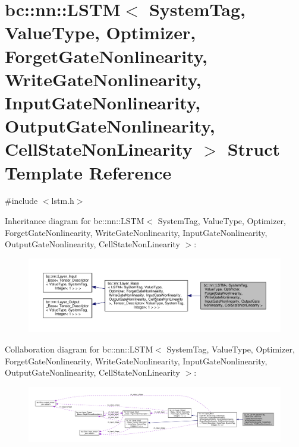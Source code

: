\hypertarget{structbc_1_1nn_1_1LSTM}{}\section{bc\+:\+:nn\+:\+:L\+S\+TM$<$ System\+Tag, Value\+Type, Optimizer, Forget\+Gate\+Nonlinearity, Write\+Gate\+Nonlinearity, Input\+Gate\+Nonlinearity, Output\+Gate\+Nonlinearity, Cell\+State\+Non\+Linearity $>$ Struct Template Reference}
\label{structbc_1_1nn_1_1LSTM}


{\ttfamily \#include $<$lstm.\+h$>$}



Inheritance diagram for bc\+:\+:nn\+:\+:L\+S\+TM$<$ System\+Tag, Value\+Type, Optimizer, Forget\+Gate\+Nonlinearity, Write\+Gate\+Nonlinearity, Input\+Gate\+Nonlinearity, Output\+Gate\+Nonlinearity, Cell\+State\+Non\+Linearity $>$\+:\nopagebreak
\begin{figure}[H]
\begin{center}
\leavevmode
\includegraphics[width=350pt]{structbc_1_1nn_1_1LSTM__inherit__graph}
\end{center}
\end{figure}


Collaboration diagram for bc\+:\+:nn\+:\+:L\+S\+TM$<$ System\+Tag, Value\+Type, Optimizer, Forget\+Gate\+Nonlinearity, Write\+Gate\+Nonlinearity, Input\+Gate\+Nonlinearity, Output\+Gate\+Nonlinearity, Cell\+State\+Non\+Linearity $>$\+:\nopagebreak
\begin{figure}[H]
\begin{center}
\leavevmode
\includegraphics[width=350pt]{structbc_1_1nn_1_1LSTM__coll__graph}
\end{center}
\end{figure}

